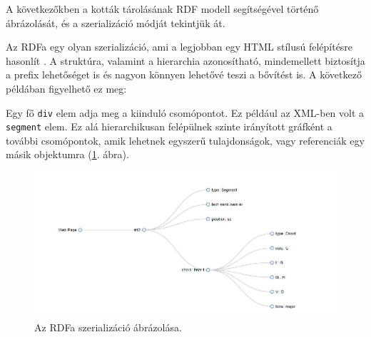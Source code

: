 
A következőkben a kották tárolásának RDF modell segítségével történő ábrázolását, és a szerializáció módját tekintjük át.


Az RDFa egy olyan szerializáció, ami a legjobban egy HTML stílusú felépítésre hasonlít \cite{rdfa_with_example}. A struktúra, valamint a hierarchia azonosítható, mindemellett biztosítja a prefix lehetőséget is és nagyon könnyen lehetővé teszi a bővítést is. A következő példában figyelhető ez meg:

Egy fő \texttt{div} elem adja meg a kiinduló csomópontot. Ez például az XML-ben volt a \texttt{segment} elem. Ez alá hierarchikusan felépülnek szinte irányított gráfként a további csomópontok, amik lehetnek egyszerű tulajdonságok, vagy referenciák egy másik objektumra (\ref{fig:rdfa}. ábra).

\begin{figure}[h]
	\includegraphics[scale=0.8]{images/misc/RDFa_serialization_example.jpg}
	\caption{Az RDFa szerializáció ábrázolása.}
	\label{fig:rdfa}
\end{figure}




